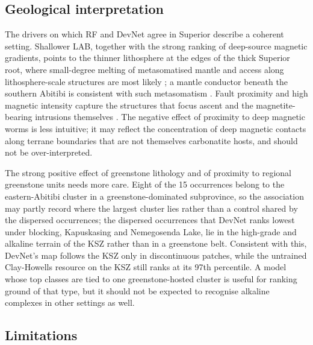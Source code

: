 \documentclass[pdflatex,sn-apa]{sn-jnl}
\begin{document}
\subsection{Geological interpretation}\label{sec:disc-geology}

The drivers on which RF and DevNet agree in Superior describe a coherent setting. Shallower LAB, together with the strong ranking of deep-source magnetic gradients, points to the thinner lithosphere at the edges of the thick Superior root, where small-degree melting of metasomatised mantle and access along lithosphere-scale structures are most likely \citep{Griffin2013,Groves2021,Hoggard2020}; a mantle conductor beneath the southern Abitibi is consistent with such metasomatism \citep{Snyder2021}. Fault proximity and high magnetic intensity capture the structures that focus ascent and the magnetite-bearing intrusions themselves \citep{Thomas2016}. The negative effect of proximity to deep magnetic worms is less intuitive; it may reflect the concentration of deep magnetic contacts along terrane boundaries that are not themselves carbonatite hosts, and should not be over-interpreted.

The strong positive effect of greenstone lithology and of proximity to regional greenstone units needs more care. Eight of the 15 occurrences belong to the eastern-Abitibi cluster in a greenstone-dominated subprovince, so the association may partly record where the largest cluster lies rather than a control shared by the dispersed occurrences; the dispersed occurrences that DevNet ranks lowest under blocking, Kapuskasing and Nemegosenda Lake, lie in the high-grade and alkaline terrain of the KSZ rather than in a greenstone belt. Consistent with this, DevNet's map follows the KSZ only in discontinuous patches, while the untrained Clay-Howells resource on the KSZ still ranks at its 97th percentile. A model whose top classes are tied to one greenstone-hosted cluster is useful for ranking ground of that type, but it should not be expected to recognise alkaline complexes in other settings as well.

\subsection{Limitations}\label{sec:limitations}
\end{document}
